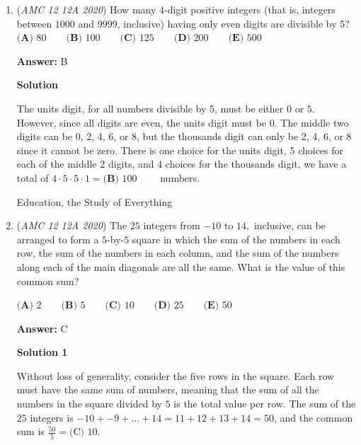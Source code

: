 \begin{enumerate}
The driver is driving for $2$ hours at $60$ miles per hour, she drives $120$ miles. Therefore, she uses $\frac{120}{30}=4$ gallons of gasoline. So, total she has $\$0.50\cdot120-\$2.00\cdot4=\$60-\$8=\$52$. So, her rate is $\frac{52}{2}=\boxed{\textbf{(E)}\ 26}$.~sosiaops

 


	\item (\textit{AMC 12 12A 2020}) How many $4$-digit positive integers (that is, integers between $1000$ and $9999$, inclusive) having only even digits are divisible by $5?$
$\textbf{(A) } 80 \qquad \textbf{(B) } 100 \qquad \textbf{(C) } 125 \qquad \textbf{(D) } 200 \qquad \textbf{(E) } 500$

 \textbf{Answer: }B



\textbf{Solution}

The units digit, for all numbers divisible by 5, must be either $0$ or $5$. However, since all digits are even, the units digit must be $0$. The middle two digits can be 0, 2, 4, 6, or 8, but the thousands digit can only be 2, 4, 6, or 8 since it cannot be zero. There is one choice for the units digit, 5 choices for each of the middle 2 digits, and 4 choices for the thousands digit, we have a total of $4\cdot5\cdot5\cdot1 = \boxed{\textbf{(B) } 100} \qquad$ numbers.

 Education, the Study of Everything

 


	\item (\textit{AMC 12 12A 2020}) The $25$ integers from $-10$ to $14,$ inclusive, can be arranged to form a $5$-by-$5$ square in which the sum of the numbers in each row, the sum of the numbers in each column, and the sum of the numbers along each of the main diagonals are all the same. What is the value of this common sum?


 $\textbf{(A) }2 \qquad\textbf{(B) } 5\qquad\textbf{(C) } 10\qquad\textbf{(D) } 25\qquad\textbf{(E) } 50$

 \textbf{Answer: }C



\textbf{Solution 1}

Without loss of generality, consider the five rows in the square. Each row must have the same sum of numbers, meaning that the sum of all the numbers in the square divided by $5$ is the total value per row. The sum of the $25$ integers is $-10+-9+...+14=11+12+13+14=50$, and the common sum is $\frac{50}{5}=\boxed{\text{(C) }10}$.


\end{enumerate}
